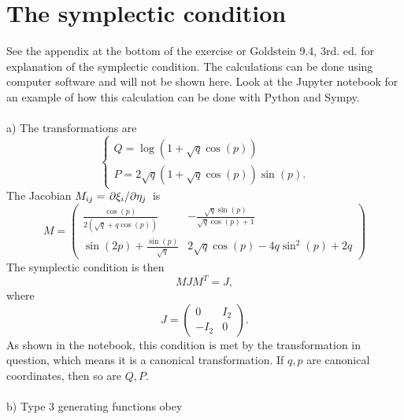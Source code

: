\documentclass{article}
\begin{document}
    \section{The symplectic condition}
    See the appendix at the bottom of the exercise or Goldstein 9.4, 3rd. ed. for explanation of the symplectic condition. The calculations can be done using computer software and will not be shown here. Look at the Jupyter notebook for an example of how this calculation can be done with Python and Sympy. \\ \\
    a) The transformations are
    \begin{equation*}
        \begin{cases}
            Q = \log(1 + \sqrt q \cos(p)) \\
            P = 2\sqrt q (1 + \sqrt q \cos(p)) \sin(p).
        \end{cases}    
    \end{equation*}
    The Jacobian $M_{ij} = \pdv*{\xi_i}{\eta_j}$ is
    \begin{equation*}
        M =  \left(
            \begin{matrix}
                \frac{\cos{\left(p \right)}}{2 \left(\sqrt{q} + q \cos{\left(p \right)}\right)} 
                & - \frac{\sqrt{q} \sin{\left(p \right)}}{\sqrt{q} \cos{\left(p \right)} + 1}\\
                \sin{\left(2 p \right)} + \frac{\sin{\left(p \right)}}{\sqrt{q}} 
                & 2 \sqrt{q} \cos{\left(p \right)} - 4 q \sin^{2}{\left(p \right)} + 2 q
            \end{matrix}\right)
    \end{equation*}
    The symplectic condition is then 
    \begin{equation*}
        M J M^T = J,
    \end{equation*}
    where 
    \begin{equation*}
        J = 
        \begin{pmatrix*}
            0 & I_2 \\
            -I_2 & 0
        \end{pmatrix*}.
    \end{equation*}
    As shown in the notebook, this condition is met by the transformation in question, which means it is a canonical transformation. If $q, p$ are canonical coordinates, then so are $Q, P$. \\ \\
    b) Type 3 generating functions obey
\end{document}
